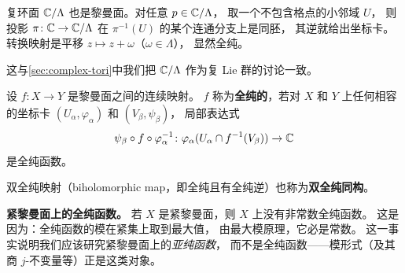 \begin{example}[复环面是黎曼面]
\label{ex:torus-riemann-surface}
复环面 $\mathbb{C}/\Lambda$ 也是黎曼面。对任意 $p \in \mathbb{C}/\Lambda$，
取一个不包含格点的小邻域 $U$，
则投影 $\pi\colon \mathbb{C} \to \mathbb{C}/\Lambda$ 在 $\pi^{-1}(U)$ 的某个连通分支上是同胚，
其逆就给出坐标卡。转换映射是平移 $z \mapsto z + \omega$（$\omega \in \Lambda$），
显然全纯。

这与\cref{sec:complex-tori}中我们把 $\mathbb{C}/\Lambda$ 作为复 Lie 群的讨论一致。
\end{example}

\begin{definition}[黎曼面之间的全纯映射]
\label{def:holomorphic-map-riemann}
设 $f\colon X \to Y$ 是黎曼面之间的连续映射。
$f$ 称为\textbf{全纯的}，若对 $X$ 和 $Y$ 上任何相容的坐标卡
$(U_\alpha, \varphi_\alpha)$ 和 $(V_\beta, \psi_\beta)$，
局部表达式
\[
  \psi_\beta \circ f \circ \varphi_\alpha^{-1}\colon
  \varphi_\alpha(U_\alpha \cap f^{-1}(V_\beta)) \to \mathbb{C}
\]
是全纯函数。

双全纯映射（biholomorphic map，即全纯且有全纯逆）也称为\textbf{双全纯同构}。
\end{definition}

\textbf{紧黎曼面上的全纯函数。}
若 $X$ 是紧黎曼面，则 $X$ 上没有非常数全纯函数。
这是因为：全纯函数的模在紧集上取到最大值，
由最大模原理，它必是常数。
这一事实说明我们应该研究紧黎曼面上的\emph{亚纯函数}，
而不是全纯函数——模形式（及其商 $j$-不变量等）正是这类对象。






